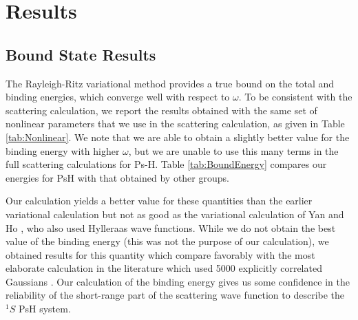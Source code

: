 \documentclass[preprint,showpacs,preprintnumbers,amsmath,amssymb]{revtex4}
\begin{document}
\section{Results}
\label{sec:Results}

\subsection{Bound State Results}

The Rayleigh-Ritz variational method provides a true bound on the total and binding energies, which converge well with respect to $\omega$. To be consistent with the scattering calculation, we report the results obtained with the same set of nonlinear parameters that we use in the scattering calculation, as given in Table \ref{tab:Nonlinear}. We note that we are able to obtain a slightly better value for the binding energy with higher $\omega$, but we are unable to use this many terms in the full scattering calculations for Ps-H. Table \ref{tab:BoundEnergy} compares our energies for PsH with that obtained by other groups.

Our calculation yields a better value for these
quantities than the earlier variational calculation \cite{VanReeth2003,VanReeth2004}
but not as good as the variational calculation of
Yan and Ho \cite{Yan1999}, who also used Hylleraas wave functions.
While we do not obtain the best value of the binding energy
(this was not the purpose of our calculation),
we obtained results for this quantity which compare favorably with
the most elaborate calculation in the literature which
used 5000 explicitly correlated Gaussians \cite{Bubin2006}.
Our calculation of the binding energy gives us some confidence
in the reliability of the short-range part of the
scattering wave function to describe
the $^1S$ PsH system.
\end{document}

